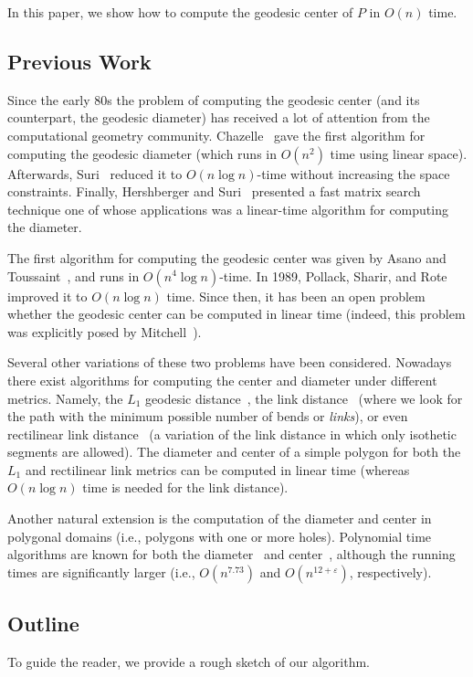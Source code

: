 \documentclass[a4paper,UKenglish]{lipics}
\begin{document}
In this paper, we show how to compute the geodesic center of $P$ in $O(n)$ time.

\subsection{Previous Work}
Since the early 80s the problem of computing the geodesic center (and its counterpart, the geodesic diameter) has received a lot of attention from the computational geometry community. Chazelle~\cite{c-tpca-82} gave the first algorithm for computing the geodesic diameter (which runs in $O(n^2)$ time using linear space). Afterwards, Suri~\cite{suri1989computing} reduced it to $O(n\log n)$-time without increasing the space constraints. Finally, Hershberger and Suri~\cite{hershberger1993matrix} presented a fast matrix search technique one of whose applications was a linear-time algorithm for computing the diameter.

The first algorithm for computing the geodesic center was given by Asano and Toussaint~\cite{at-cgcsp-85}, and runs in $O(n^4\log n)$-time. In 1989, Pollack, Sharir, and Rote~\cite{pollackComputingCenter} improved it to $O(n\log n)$ time. Since then, it has been an open problem whether the geodesic center can be
computed in linear time (indeed, this problem was explicitly posed by Mitchell~\cite{m-gspno-00}).

Several other variations of these two problems have been considered. Nowadays there exist algorithms for computing the center and diameter under different metrics. Namely, the $L_1$ geodesic distance~\cite{bkow-clgdcsplt-13},  the link distance~\cite{suri-mlpprp-87,k-ealdp-89,dls-aclcsp-92} (where we look for the path with the minimum possible number of bends or {\em links}), or even rectilinear link distance~\cite{ns-crldp-91,ns-oarlcrp-96} (a variation of the link distance in which only isothetic segments are allowed). The diameter and center of a simple polygon for both the $L_1$ and rectilinear link metrics can be computed in linear time (whereas $O(n\log n)$ time is needed for the link distance).

Another natural extension is the computation of the diameter and center in polygonal domains (i.e., polygons with one or more holes). Polynomial time algorithms are known for both the diameter~\cite{bko-gdpd-13} and center~\cite{bko-cgcpd-14}, although the running times are significantly larger (i.e., $O(n^{7.73})$ and $O(n^{12+\varepsilon})$, respectively).

\subsection{Outline}
To guide the reader, we provide a rough sketch of our algorithm.
\end{document}
